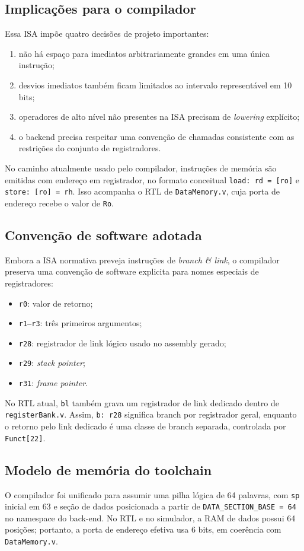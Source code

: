 \documentclass[12pt,a4paper]{article}
\begin{document}
\subsection{Implicações para o compilador}
Essa ISA impõe quatro decisões de projeto importantes:
\begin{enumerate}[leftmargin=1.5em]
    \item não há espaço para imediatos arbitrariamente grandes em uma única instrução;
    \item desvios imediatos também ficam limitados ao intervalo representável em 10 bits;
    \item operadores de alto nível não presentes na ISA precisam de \emph{lowering} explícito;
    \item o backend precisa respeitar uma convenção de chamadas consistente com as restrições do conjunto de registradores.
\end{enumerate}

No caminho atualmente usado pelo compilador, instruções de memória são emitidas com endereço em registrador, no formato conceitual \texttt{load: rd = [ro]} e \texttt{store: [ro] = rh}. Isso acompanha o RTL de \texttt{DataMemory.v}, cuja porta de endereço recebe o valor de \texttt{Ro}.

\subsection{Convenção de software adotada}
Embora a ISA normativa preveja instruções de \emph{branch \& link}, o compilador preserva uma convenção de software explicita para nomes especiais de registradores:
\begin{itemize}[leftmargin=1.5em]
    \item \texttt{r0}: valor de retorno;
    \item \texttt{r1--r3}: três primeiros argumentos;
    \item \texttt{r28}: registrador de link lógico usado no assembly gerado;
    \item \texttt{r29}: \emph{stack pointer};
    \item \texttt{r31}: \emph{frame pointer}.
\end{itemize}
No RTL atual, \texttt{bl} também grava um registrador de link dedicado dentro de \texttt{registerBank.v}. Assim, \texttt{b: r28} significa branch por registrador geral, enquanto o retorno pelo link dedicado é uma classe de branch separada, controlada por \texttt{Funct[22]}.

\subsection{Modelo de memória do toolchain}
O compilador foi unificado para assumir uma pilha lógica de 64 palavras, com \texttt{sp} inicial em 63 e seção de dados posicionada a partir de \texttt{DATA\_SECTION\_BASE = 64} no namespace do back-end. No RTL e no simulador, a RAM de dados possui 64 posições; portanto, a porta de endereço efetiva usa 6 bits, em coerência com \texttt{DataMemory.v}.
\end{document}
